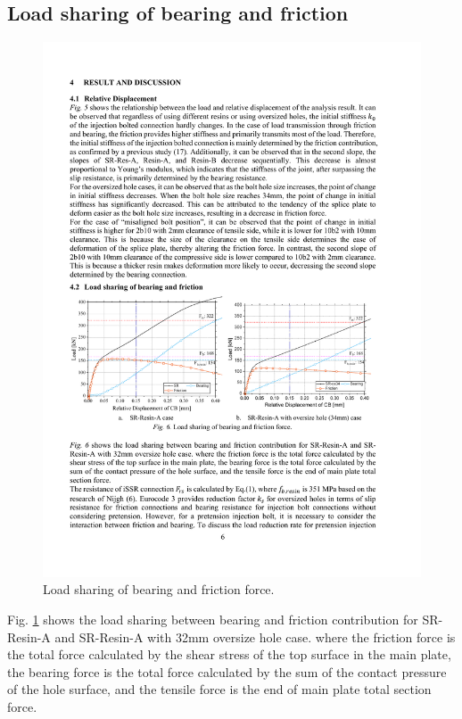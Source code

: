 \subsection{Load sharing of bearing and friction}

\begin{figure}[htbp]
    \centering
    \includegraphics[width=\textwidth]{imgs/app3/LDS-RIBJ.pdf}
    \caption{Load sharing of bearing and friction force.}
    \label{fig-LDS-RIBJ}
\end{figure}

Fig. \ref{fig-LDS-RIBJ} shows the load sharing between bearing and friction contribution for SR-Resin-A and SR-Resin-A with 32mm oversize hole case. where the friction force is the total force calculated by the shear stress of the top surface in the main plate, the bearing force is the total force calculated by the sum of the contact pressure of the hole surface, and the tensile force is the end of main plate total section force.

